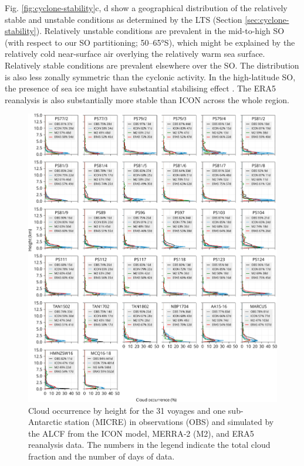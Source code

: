 \documentclass[12pt,a4paper]{article}
\begin{document}
Fig. \ref{fig:cyclone-stability}c, d show a geographical distribution of the
relatively stable and unstable conditions as determined by the LTS (Section
\ref{sec:cyclone-stability}). Relatively unstable conditions are prevalent
in the mid-to-high SO (with respect to our SO partitioning; 50--65°S), which might be explained by the relatively cold
near-surface air overlying the relatively warm sea surface. Relatively
stable conditions are prevalent elsewhere over the SO. The distribution is also
less zonally symmetric than the cyclonic activity.  In the high-latitude SO,
the presence of sea ice might have substantial stabilising effect
\citep{knight2024}. The ERA5 reanalysis is also substantially more stable than
ICON across the whole region.

\begin{figure}[p!]
\centerline{
\includegraphics[width=1.06\textwidth]{img/cloud_occurrence_panel.pdf}
}
\caption{Cloud occurrence by height for the 31 voyages and one sub-Antarctic
station (MICRE) in observations (OBS) and simulated by the ALCF from the
ICON model, MERRA‐2 (M2), and ERA5 reanalysis data. The numbers in the legend
indicate the total cloud fraction and the number of days of data.}
\label{fig:cloud-occurrence-panel}
\end{figure}
\end{document}
